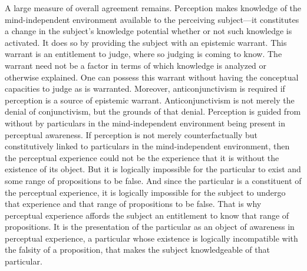 \documentclass[12pt]{article}
\begin{document}
A large measure of overall agreement remains. Perception makes knowledge of the mind-inde\-pen\-dent environment available to the perceiving subject---it constitutes a change in the subject's knowledge potential whether or not such knowledge is activated. It does so by providing the subject with an epistemic warrant. This warrant is an entitlement to judge, where so judging is coming to know. The warrant need not be a factor in terms of which knowledge is analyzed or otherwise explained. One can possess this warrant without having the conceptual capacities to judge as is warranted. Moreover, anticonjunctivism is required if perception is a source of epistemic warrant. Anticonjunctivism is not merely the denial of conjunctivism, but the grounds of that denial. Perception is guided from without by particulars in the mind-independent environment being present in perceptual awareness. If perception is not merely counterfactually but constitutively linked to particulars in the mind-independent environment, then the perceptual experience could not be the experience that it is without the existence of its object. But it is logically impossible for the particular to exist and some range of propositions to be false. And since the particular is a constituent of the perceptual experience, it is logically impossible for the subject to undergo that experience and that range of propositions to be false. That is why perceptual experience affords the subject an entitlement to know that range of propositions. It is the presentation of the particular as an object of awareness in perceptual experience, a particular whose existence is logically incompatible with the falsity of a proposition, that makes the subject knowledgeable of that particular.

\end{document}
